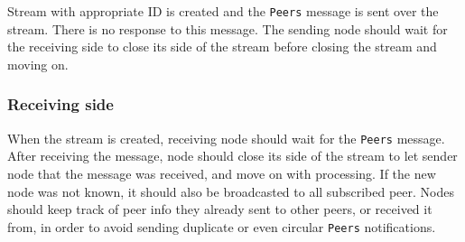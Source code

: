 Stream with appropriate ID is created and the \texttt{Peers} message is
sent over the stream. There is no response to this message. The sending
node should wait for the receiving side to close its side of the stream
before closing the stream and moving on.

\subsubsection{Receiving side}\label{receiving-side}

When the stream is created, receiving node should wait for the
\texttt{Peers} message. After receiving the message, node should close
its side of the stream to let sender node that the message was received,
and move on with processing. If the new node was not known, it should
also be broadcasted to all subscribed peer. Nodes should keep track of
peer info they already sent to other peers, or received it from, in
order to avoid sending duplicate or even circular \texttt{Peers}
notifications.